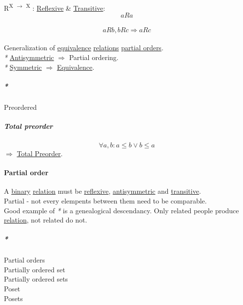 \documentclass[11pt]{article}
\begin{document}
R\textsuperscript{X \(\to\) X} : \hyperref[org59bfc97]{Reflexive} \& \hyperref[org8a18554]{Transitive}:\\
$$ aRa $$\\
$$ aRb, bRc \Rightarrow aRc $$\\

Generalization of \hyperref[orgad1fc87]{equivalence} \hyperref[org5e14e7d]{relations} \hyperref[org64bde92]{partial orders}.\\

\emph{*} \hyperref[org11a1c21]{Antisymmetric} \(\Rightarrow\) Partial ordering.\\
\emph{*} \hyperref[org8248303]{Symmetric} \(\Rightarrow\) \hyperref[orgad1fc87]{Equivalence}.\\

\subparagraph{\emph{*}}
\label{sec:org8826f23}

\label{org995e436}Preordered\\

\subparagraph{\label{org352ee97}Total preorder}
\label{sec:org3c6335c}

$$ \forall a,b : a \le b \lor b \le a $$ \(\Rightarrow\) \hyperref[org352ee97]{Total Preorder}.\\

\paragraph{\label{org22d7702}Partial order}
\label{sec:org4efad49}

A \hyperref[orgee106ab]{binary} \hyperref[org6e8ae46]{relation} must be \hyperref[org59bfc97]{reflexive}, \hyperref[org11a1c21]{antisymmetric} and \hyperref[org8a18554]{transitive}.\\

Partial - not every elempents between them need to be comparable.\\

Good example of \emph{*} is a genealogical descendancy. Only related people produce \hyperref[org6e8ae46]{relation}, not related do not.\\

\subparagraph{\emph{*}}
\label{sec:org0aaa474}

\label{org64bde92}Partial orders\\
\label{org63f1dad}Partially ordered set\\
\label{orgd57559c}Partially ordered sets\\
\label{org89619c8}Poset\\
\label{org5268374}Posets\\
\end{document}
